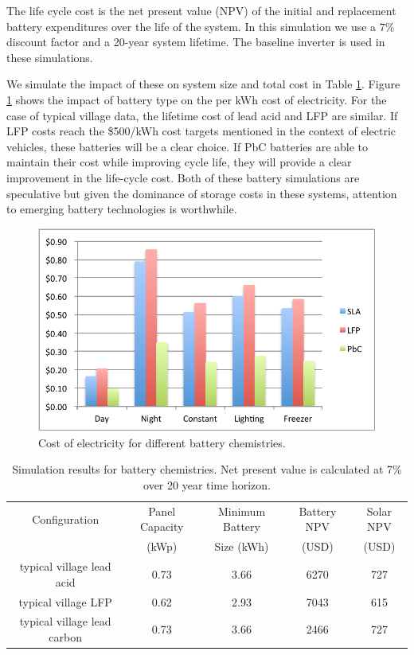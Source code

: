 \documentclass[conference]{IEEEtran}
\begin{document}
The life cycle cost is the net present value (NPV) of the 
initial and replacement battery expenditures over the life 
of the system.  
In this simulation we use a 7\% discount factor and a 20-year
system lifetime.
The baseline inverter is used in these simulations.

We simulate the impact of these on system size and total cost
in Table \ref{table_battery}.
Figure \ref{fig_battery} shows the impact of battery type on
the per kWh cost of electricity.
For the case of typical village data, the lifetime cost of 
lead acid and LFP are similar.
If LFP costs reach the \$500/kWh cost targets mentioned in
the context of electric vehicles, these batteries will 
be a clear choice.
If PbC batteries are able to maintain their cost while
improving cycle life, they will provide a clear improvement
in the life-cycle cost.
Both of these battery simulations are speculative but given
the dominance of storage costs in these systems, attention
to emerging battery technologies is worthwhile.

\begin{figure}[]
\begin{center}
\includegraphics[width=\columnwidth]{figures/battery.pdf}
\end{center}
\caption{Cost of electricity for different battery chemistries.}
\label{fig_battery}
\end{figure}


\begin{table}[!t]
\centering
\begin{tabular}{ c c c c c }
Configuration & Panel Capacity & Minimum Battery & Battery NPV & Solar NPV \\
              & (kWp)          & Size (kWh)      & (USD)       & (USD)     \\
\hline
typical village lead acid      & 0.73 & 3.66 & 6270 & 727 \\
typical village LFP            & 0.62 & 2.93 & 7043 & 615 \\
typical village lead carbon    & 0.73 & 3.66 & 2466 & 727 \\
\end{tabular}
\caption{Simulation results for battery chemistries.
Net present value is calculated at 7\% over 20 year 
time horizon.}
\label{table_battery}
\end{table}
\end{document}
